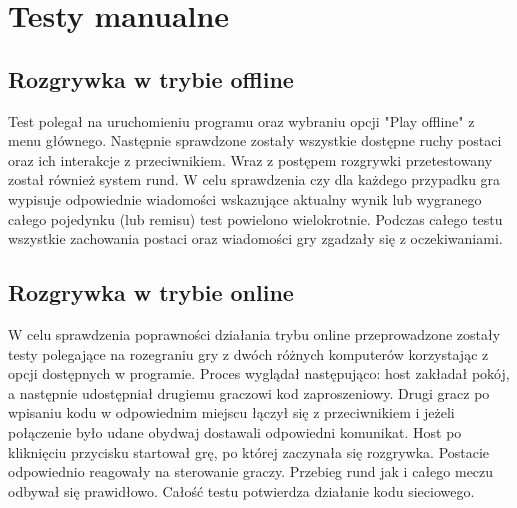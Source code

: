 \section{Testy manualne}
\subsection{Rozgrywka w trybie offline}
Test polegał na uruchomieniu programu oraz wybraniu opcji "Play offline" z menu głównego. Następnie sprawdzone zostały wszystkie dostępne ruchy postaci oraz ich interakcje z przeciwnikiem. Wraz z postępem rozgrywki przetestowany został również system rund. W celu sprawdzenia czy dla każdego przypadku gra wypisuje odpowiednie wiadomości wskazujące aktualny wynik lub wygranego całego pojedynku (lub remisu) test powielono wielokrotnie. Podczas całego testu wszystkie zachowania postaci oraz wiadomości gry zgadzały się z oczekiwaniami.

\subsection{Rozgrywka w trybie online}
W celu sprawdzenia poprawności działania trybu online przeprowadzone zostały testy polegające na rozegraniu gry z dwóch różnych komputerów korzystając z opcji dostępnych w programie. Proces wyglądał następująco: host zakładał pokój, a następnie udostępniał drugiemu graczowi kod zaproszeniowy. Drugi gracz po wpisaniu kodu w odpowiednim miejscu łączył się z przeciwnikiem i jeżeli połączenie było udane obydwaj dostawali odpowiedni komunikat. Host po kliknięciu przycisku startował grę, po której zaczynała się rozgrywka. Postacie odpowiednio reagowały na sterowanie graczy. Przebieg rund jak i całego meczu odbywał się prawidłowo. Całość testu potwierdza działanie kodu sieciowego.


